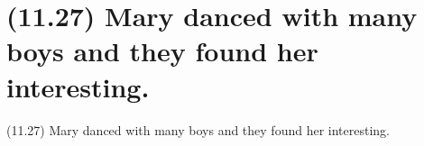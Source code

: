 \documentclass{article}
\begin{document}
\clearpage

%
%

\section*{(11.27) Mary danced with many boys and they found her interesting.}

\bigbreak
\begin{enumerate*}
\item[(11.27)] Mary danced with many boys and they found her interesting.
\end{enumerate*}
\bigbreak
\end{document}

